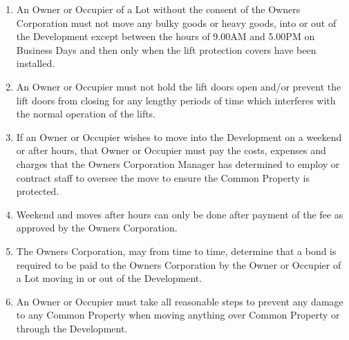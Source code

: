 \documentclass{article}
\begin{document}
\begin{enumerate}[label=\arabic*.]
\begin{enumerate}[label=\arabic{enumi}.\arabic*.]
\begin{enumerate}[label=(\arabic*)]
\begin{enumerate}[label=(\arabic*)]
\begin{enumerate}[label=(\alph*)]
\item  without first making an appointment with the Owners Corporation at least three (3) Business Days before the intended move;

\item  by only using the lift/s nominated by the Owners Corporation which have had protective covers installed by the Owners Corporation in the lift; and

\item  other than strictly in accordance with the directions of the Owners Corporation, which may include a direction to only load and deliver any goods from a rear entrance.

\end{enumerate}

\item  An Owner or Occupier of a Lot without the consent of the Owners Corporation must not move any bulky goods or heavy goods, into or out of the Development except between the hours of 9.00AM and 5.00PM on Business Days and then only when the lift protection covers have been installed.

\item  An Owner or Occupier must not hold the lift doors open and/or prevent the lift doors from closing for any lengthy periods of time which interferes with the normal operation of the lifts.

\item  If an Owner or Occupier wishes to move into the Development on a weekend or after hours, that Owner or Occupier must pay the costs, expenses and charges that the Owners Corporation Manager has determined to employ or contract staff to oversee the move to ensure the Common Property is protected.

\item  Weekend and moves after hours can only be done after payment of the fee as approved by the Owners Corporation.

\item  The Owners Corporation, may from time to time, determine that a bond is required to be paid to the Owners Corporation by the Owner or Occupier of a Lot moving in or out of the Development.

\item  An Owner or Occupier must take all reasonable steps to prevent any damage to any Common Property when moving anything over Common Property or through the Development.


\end{enumerate}
\end{enumerate}
\end{enumerate}
\end{enumerate}
\end{document}
